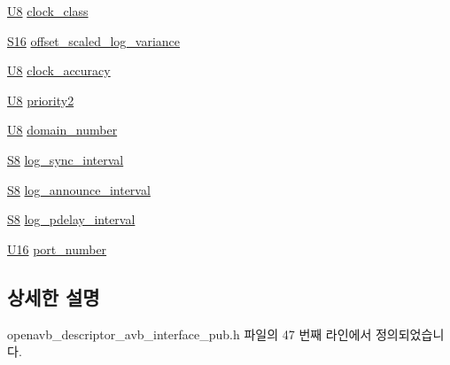 \begin{DoxyCompactItemize}
\item 
\hyperlink{openavb__types__base__pub_8h_aa63ef7b996d5487ce35a5a66601f3e73}{U8} \hyperlink{structopenavb__aem__descriptor__avb__interface__t_ad76b630284ce2e06ad5995562a18d102}{clock\+\_\+class}
\item 
\hyperlink{openavb__types__base__pub_8h_a6d241ad21a823c90d4835380787db5d4}{S16} \hyperlink{structopenavb__aem__descriptor__avb__interface__t_a333280c59ed0f04a40da2b210fbf2e97}{offset\+\_\+scaled\+\_\+log\+\_\+variance}
\item 
\hyperlink{openavb__types__base__pub_8h_aa63ef7b996d5487ce35a5a66601f3e73}{U8} \hyperlink{structopenavb__aem__descriptor__avb__interface__t_a80c83d7e3db9172ecc147da3aedccd64}{clock\+\_\+accuracy}
\item 
\hyperlink{openavb__types__base__pub_8h_aa63ef7b996d5487ce35a5a66601f3e73}{U8} \hyperlink{structopenavb__aem__descriptor__avb__interface__t_ac15d4b669bc19e29abefa46b54d36656}{priority2}
\item 
\hyperlink{openavb__types__base__pub_8h_aa63ef7b996d5487ce35a5a66601f3e73}{U8} \hyperlink{structopenavb__aem__descriptor__avb__interface__t_ae16980919f4d64eddcb9820bce026960}{domain\+\_\+number}
\item 
\hyperlink{openavb__types__base__pub_8h_af1475a0bb1962ef08dd1f78bd5dba87a}{S8} \hyperlink{structopenavb__aem__descriptor__avb__interface__t_a9d775a7830d6374c958e5310b6881d3b}{log\+\_\+sync\+\_\+interval}
\item 
\hyperlink{openavb__types__base__pub_8h_af1475a0bb1962ef08dd1f78bd5dba87a}{S8} \hyperlink{structopenavb__aem__descriptor__avb__interface__t_a9801ad0dcf804d19e655704dc20b27bb}{log\+\_\+announce\+\_\+interval}
\item 
\hyperlink{openavb__types__base__pub_8h_af1475a0bb1962ef08dd1f78bd5dba87a}{S8} \hyperlink{structopenavb__aem__descriptor__avb__interface__t_aa5c65ae2d23c3de36a7c307e916a04ed}{log\+\_\+pdelay\+\_\+interval}
\item 
\hyperlink{openavb__types__base__pub_8h_a0a0a322d5fa4a546d293a77ba8b4a71f}{U16} \hyperlink{structopenavb__aem__descriptor__avb__interface__t_aa69e8333d5f9e0ee0ec95f4defe134b4}{port\+\_\+number}
\end{DoxyCompactItemize}


\subsection{상세한 설명}


openavb\+\_\+descriptor\+\_\+avb\+\_\+interface\+\_\+pub.\+h 파일의 47 번째 라인에서 정의되었습니다.



